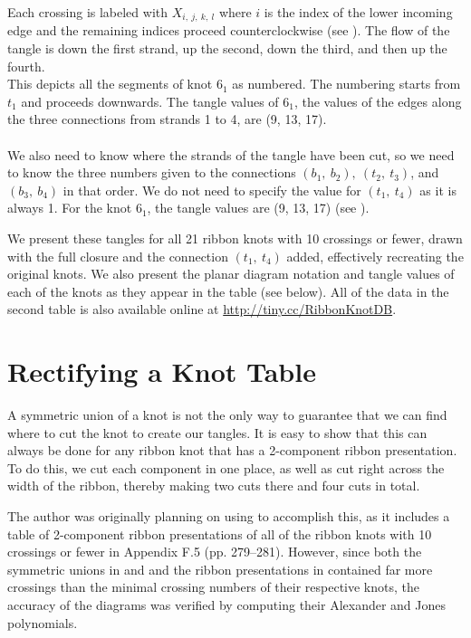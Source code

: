\documentclass{ws-jktr}
\begin{document}
Each crossing is labeled with $X_{i,~j,~k,~l}$ where $i$ is the index of the
lower incoming edge and the remaining indices proceed counterclockwise (see
\figCrossing).
The flow of the tangle is down the first strand, up the second, down the third,
and then up the fourth.\\

{This depicts all the segments of knot $6_1$ as numbered.
The numbering starts from $t_1$ and proceeds downwards.
The tangle values of $6_1$, the values of the edges along the three connections
from strands 1 to 4, are (9, 13, 17).}\\\\

We also need to know where the strands of the tangle have been cut, so we need
to know the three numbers given to the connections $(b_1,~b_2),~(t_2,~t_3)$, and
$(b_3,~b_4)$ in that order.
We do not need to specify the value for $(t_1,~t_4)$ as it is always 1.
For the knot $6_1$, the tangle values are (9, 13, 17) (see \figExample).

We present these tangles for all 21 ribbon knots with 10 crossings or fewer,
drawn with the full closure and the connection $(t_1,~t_4)$ added, effectively
recreating the original knots.
We also present the planar diagram notation and tangle values of each of the
knots as they appear in the table (see below).
All of the data in the second table is also available online at
\url{http://tiny.cc/RibbonKnotDB}.

\section{Rectifying a Knot Table}

A symmetric union of a knot is not the only way to guarantee that we can find
where to cut the knot to create our tangles.
It is easy to show that this can always be done for any ribbon knot that has a
2-component ribbon presentation.
To do this, we cut each component in one place, as well as cut right across the
width of the ribbon, thereby making two cuts there and four cuts in total.

The author was originally planning on using \cite{knots} to accomplish this, as
it includes a table of 2-component ribbon presentations of all of the ribbon
knots with 10 crossings or fewer in Appendix F.5 (pp. 279--281).
However, since both the symmetric unions in \cite{one} and \cite{many} and the
ribbon presentations in \cite{knots} contained far more crossings than the
minimal crossing numbers of their respective knots, the accuracy of the diagrams
was verified by computing their Alexander and Jones polynomials.
\end{document}
